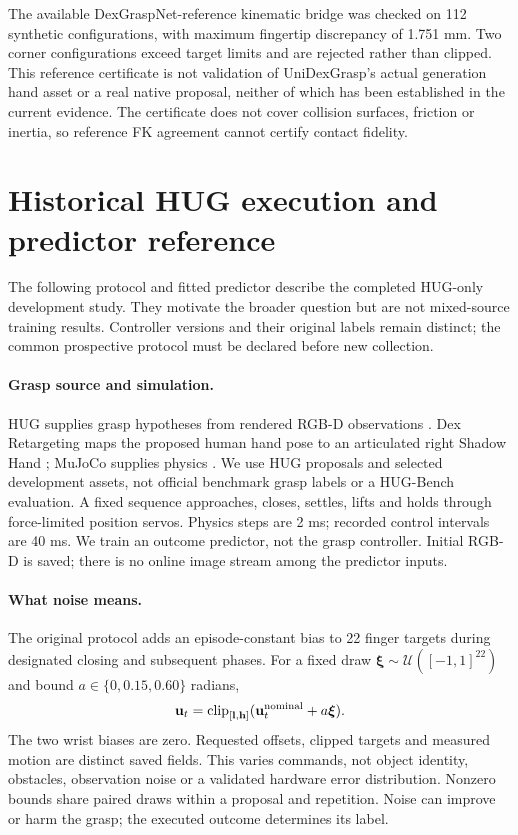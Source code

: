 \documentclass[10pt,letterpaper]{article}
\begin{document}
The available DexGraspNet-reference kinematic bridge was checked on 112 synthetic
configurations, with maximum fingertip discrepancy of 1.751 mm. Two corner
configurations exceed target limits and are rejected rather than clipped.
This reference certificate is not validation of UniDexGrasp's actual generation
hand asset or a real native proposal, neither of which has been established in
the current evidence. The certificate does not cover collision surfaces,
friction or inertia, so reference FK agreement cannot certify contact fidelity.

\section{Historical HUG execution and predictor reference}
The following protocol and fitted predictor describe the completed HUG-only
development study. They motivate the broader question but are not mixed-source
training results. Controller versions and their original labels remain distinct;
the common prospective protocol must be declared before new collection.
\paragraph{Grasp source and simulation.}
HUG supplies grasp hypotheses from rendered RGB-D observations \cite{hug}.
Dex Retargeting maps the proposed human hand pose to an articulated right
Shadow Hand \cite{dex}; MuJoCo supplies physics \cite{mujoco}. We use HUG
proposals and selected development assets, not official benchmark grasp labels
or a HUG-Bench evaluation. A fixed sequence approaches, closes, settles, lifts
and holds through force-limited position servos. Physics steps are 2 ms;
recorded control intervals are 40 ms. We train an outcome predictor, not the
grasp controller. Initial RGB-D is saved; there is no online image stream among
the predictor inputs.

\paragraph{What noise means.}
The original  protocol adds an episode-constant
bias to 22 finger targets during designated closing and subsequent phases.
For a fixed draw $\boldsymbol\xi\sim\mathcal U([-1,1]^{22})$ and bound
$a\in\{0,0.15,0.60\}$ radians,
\[
 \mathbf u_t=\operatorname{clip}_{[\mathbf l,\mathbf h]}
 (\mathbf u_t^{\rm nominal}+a\boldsymbol\xi).
\]
The two wrist biases are zero. Requested offsets, clipped targets and measured
motion are distinct saved fields. This varies commands, not object identity,
obstacles, observation noise or a validated hardware error distribution.
Nonzero bounds share paired draws within a proposal and repetition. Noise can
improve or harm the grasp; the executed outcome determines its label.
\end{document}
